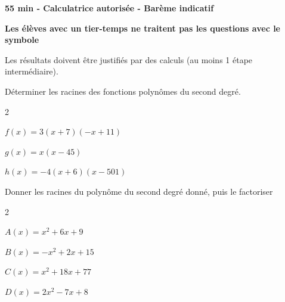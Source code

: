 \documentclass[12pt,a4paper]{article}  %
\begin{document}
\begin{center}

\end{center}


\begin{center}\textbf{55 min - Calculatrice autorisée - Barème indicatif}\end{center}

\begin{center}\textbf{Les élèves avec un tier-temps ne traitent pas les questions avec  le symbole }\end{center}

\begin{center}
Les résultats doivent être justifiés par des calculs (au moins 1 étape intermédiaire).
\end{center}
\vspace{.05cm} 


Déterminer les racines des fonctions polynômes du second degré.
\begin{multicols}{2}
\begin{enumMet}
    \item {} $f(x)=3(x+7)(-x+11)$
    \item $g(x)=x(x-45)$
    \item $h(x)=-4(x+6)(x-501)$
\end{enumMet}
\end{multicols}

\vspace{-0.3cm}

Donner les racines du polynôme du second degré donné, puis le factoriser
\begin{multicols}{2}
\begin{enumMet}
    \item $A(x)=x^{2}+6 x+9$
    \item {} $B(x)=-x^{2}+2 x+15$
    \item $C(x)=x^{2}+18 x+77$
    \item $D(x)=2 x^{2}-7 x+8$
\end{enumMet}
\end{multicols}
\end{document}
